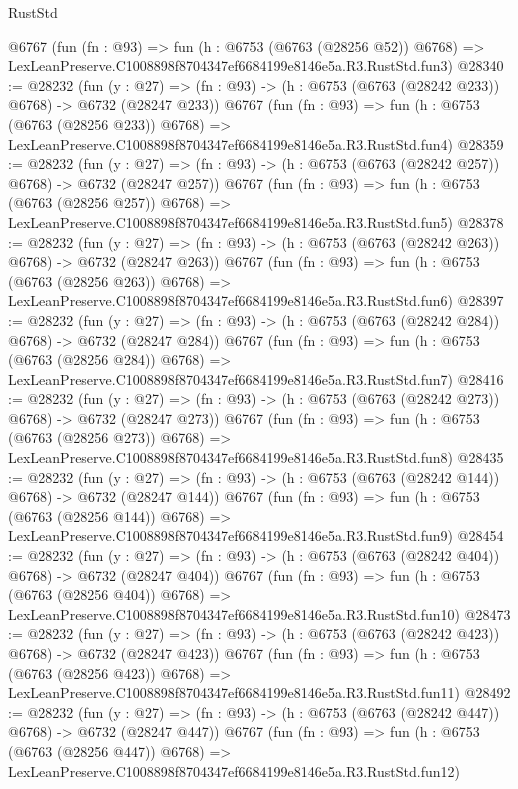 \begin{lexlean}{RustStd}
\begin{coremodule}
    @6767
    (fun (fn : @93) =>
    fun (h : @6753 (@6763 (@28256 @52)) @6768) =>
    LexLeanPreserve.C1008898f8704347ef6684199e8146e5a.R3.RustStd.fun3)
@28340 := @28232
    (fun (y : @27) => (fn : @93) -> (h : @6753 (@6763 (@28242 @233)) @6768) -> @6732 (@28247 @233))
    @6767
    (fun (fn : @93) =>
    fun (h : @6753 (@6763 (@28256 @233)) @6768) =>
    LexLeanPreserve.C1008898f8704347ef6684199e8146e5a.R3.RustStd.fun4)
@28359 := @28232
    (fun (y : @27) => (fn : @93) -> (h : @6753 (@6763 (@28242 @257)) @6768) -> @6732 (@28247 @257))
    @6767
    (fun (fn : @93) =>
    fun (h : @6753 (@6763 (@28256 @257)) @6768) =>
    LexLeanPreserve.C1008898f8704347ef6684199e8146e5a.R3.RustStd.fun5)
@28378 := @28232
    (fun (y : @27) => (fn : @93) -> (h : @6753 (@6763 (@28242 @263)) @6768) -> @6732 (@28247 @263))
    @6767
    (fun (fn : @93) =>
    fun (h : @6753 (@6763 (@28256 @263)) @6768) =>
    LexLeanPreserve.C1008898f8704347ef6684199e8146e5a.R3.RustStd.fun6)
@28397 := @28232
    (fun (y : @27) => (fn : @93) -> (h : @6753 (@6763 (@28242 @284)) @6768) -> @6732 (@28247 @284))
    @6767
    (fun (fn : @93) =>
    fun (h : @6753 (@6763 (@28256 @284)) @6768) =>
    LexLeanPreserve.C1008898f8704347ef6684199e8146e5a.R3.RustStd.fun7)
@28416 := @28232
    (fun (y : @27) => (fn : @93) -> (h : @6753 (@6763 (@28242 @273)) @6768) -> @6732 (@28247 @273))
    @6767
    (fun (fn : @93) =>
    fun (h : @6753 (@6763 (@28256 @273)) @6768) =>
    LexLeanPreserve.C1008898f8704347ef6684199e8146e5a.R3.RustStd.fun8)
@28435 := @28232
    (fun (y : @27) => (fn : @93) -> (h : @6753 (@6763 (@28242 @144)) @6768) -> @6732 (@28247 @144))
    @6767
    (fun (fn : @93) =>
    fun (h : @6753 (@6763 (@28256 @144)) @6768) =>
    LexLeanPreserve.C1008898f8704347ef6684199e8146e5a.R3.RustStd.fun9)
@28454 := @28232
    (fun (y : @27) => (fn : @93) -> (h : @6753 (@6763 (@28242 @404)) @6768) -> @6732 (@28247 @404))
    @6767
    (fun (fn : @93) =>
    fun (h : @6753 (@6763 (@28256 @404)) @6768) =>
    LexLeanPreserve.C1008898f8704347ef6684199e8146e5a.R3.RustStd.fun10)
@28473 := @28232
    (fun (y : @27) => (fn : @93) -> (h : @6753 (@6763 (@28242 @423)) @6768) -> @6732 (@28247 @423))
    @6767
    (fun (fn : @93) =>
    fun (h : @6753 (@6763 (@28256 @423)) @6768) =>
    LexLeanPreserve.C1008898f8704347ef6684199e8146e5a.R3.RustStd.fun11)
@28492 := @28232
    (fun (y : @27) => (fn : @93) -> (h : @6753 (@6763 (@28242 @447)) @6768) -> @6732 (@28247 @447))
    @6767
    (fun (fn : @93) =>
    fun (h : @6753 (@6763 (@28256 @447)) @6768) =>
    LexLeanPreserve.C1008898f8704347ef6684199e8146e5a.R3.RustStd.fun12)

\end{coremodule}
\end{lexlean}
